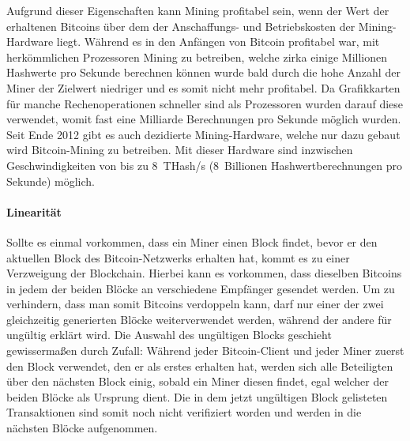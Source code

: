 Aufgrund dieser Eigenschaften kann Mining profitabel sein, wenn der Wert der erhaltenen Bitcoins über dem der Anschaffungs- und Betriebskosten der Mining-Hardware liegt.
Während es in den Anfängen von Bitcoin profitabel war, mit herkömmlichen Prozessoren Mining zu betreiben, welche zirka einige Millionen Hashwerte pro Sekunde berechnen können wurde bald durch die hohe Anzahl der Miner der Zielwert niedriger und es somit nicht mehr profitabel.
Da Grafikkarten für manche Rechenoperationen schneller sind als Prozessoren wurden darauf diese verwendet, womit fast eine Milliarde Berechnungen pro Sekunde möglich wurden.
Seit Ende 2012 gibt es auch dezidierte Mining-Hardware, welche nur dazu gebaut wird Bitcoin-Mining zu betreiben.
Mit dieser Hardware sind inzwischen Geschwindigkeiten von bis zu 8~THash/s (8~Billionen Hashwertberechnungen pro Sekunde) möglich.

\paragraph{Linearität}

Sollte es einmal vorkommen, dass ein Miner einen Block findet, bevor er den aktuellen Block des Bitcoin-Netzwerks erhalten hat, kommt es zu einer Verzweigung der Blockchain.
Hierbei kann es vorkommen, dass dieselben Bitcoins in jedem der beiden Blöcke an verschiedene Empfänger gesendet werden.
Um zu verhindern, dass man somit Bitcoins verdoppeln kann, darf nur einer der zwei gleichzeitig generierten Blöcke weiterverwendet werden, während der andere für ungültig erklärt wird.
Die Auswahl des ungültigen Blocks geschieht gewissermaßen durch Zufall:
Während jeder Bitcoin-Client und jeder Miner zuerst den Block verwendet, den er als erstes erhalten hat, werden sich alle Beteiligten über den nächsten Block einig, sobald ein Miner diesen findet, egal welcher der beiden Blöcke als Ursprung dient.
Die in dem jetzt ungültigen Block gelisteten Transaktionen sind somit noch nicht verifiziert worden und werden in die nächsten Blöcke aufgenommen.
